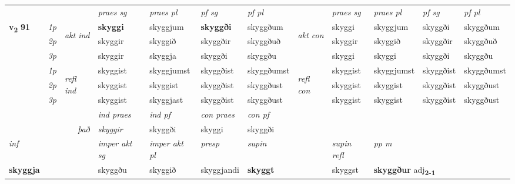 \begin{longtable}[l]{X>{\footnotesize\itshape}llXXXXlXXXX}
 & &   & \textit{praes sg}  & \textit{praes pl}    & \textit{ pf sg} & \textit{pf pl} & & \textit{praes sg}  & \textit{praes pl}    & \textit{pf sg} & \textit{pf pl }  \\ \cmidrule{4-7} \cmidrule{9-12}
 \multirow{2}{*}{{{\textbf{v{\textsubscript{2}}} \Large{\textbf{91}}}}}  & 1p & \multirow{3}{*}{\begin{turn}{90}\textit{akt ind}\end{turn}} & \textbf{skyggi} & skyggjum & \textbf{skyggði} & skyggðum & \multirow{3}{*}{\begin{turn}{90}\textit{akt con}\end{turn}} &skyggi & skyggjum & skyggði & skyggðum\\*
 & 2p &  &  skyggir  & skyggið & skyggðir & skyggðuð & & skyggir & skyggið & skyggðir & skyggðuð \\*
 & 3p &  & skyggir & skyggja & skyggði & skyggðu & & skyggi & skyggi& skyggði & skyggðu \\*
\cmidrule{4-7} \cmidrule{9-12}
 & 1p & \multirow{3}{*}{\begin{turn}{90}\textit{refl ind}\end{turn}}  & skyggist & skyggjumst & skyggðist & skyggðumst & \multirow{3}{*}{\begin{turn}{90}\textit{refl con}\end{turn}}  &skyggist & skyggjumst & skyggðist & skyggðumst \\*
 & 2p &  & skyggist & skyggist & skyggðist & skyggðust & &skyggist & skyggist & skyggðist & skyggðust \\*
 & 3p  & & skyggist & skyggjast & skyggðist & skyggðust & & skyggist & skyggist& skyggðist & skyggðust \\*
\cmidrule{4-7} \cmidrule{9-12}

   && &  \textit{ind praes} & \textit{ind pf} & \textit{con praes} & \textit{con pf} \\*
\multicolumn{3}{r}{\textit{það}} & skyggir & skyggði & skyggi & skyggði \\*

\cmidrule{4-7}
   {\textit{inf}} & &  & \textit{imper akt sg} & \textit{imper akt pl}   & \textit{presp} & \textit{supin} && \textit{supin refl} & \textit{pp m} \\*
  {\textbf{skyggja}} & && skyggðu  & skyggið   & skyggjandi &  \textbf{skyggt} && skyggst & \multicolumn{2}{l}{\textbf{skyggður} adj\textbf{\textsubscript{2-1}}} \\*

\midrule


\end{longtable}

